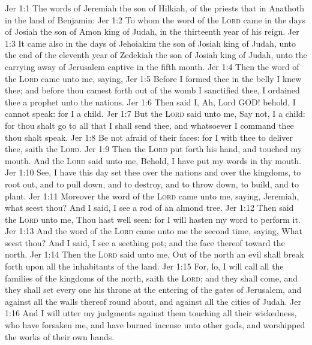 \vs Jer 1:1 The words of Jeremiah the son of Hilkiah, of the priests that  in Anathoth in the land of Benjamin:
\vs Jer 1:2 To whom the word of the \textsc{Lord} came in the days of Josiah the son of Amon king of Judah, in the thirteenth year of his reign.
\vs Jer 1:3 It came also in the days of Jehoiakim the son of Josiah king of Judah, unto the end of the eleventh year of Zedekiah the son of Josiah king of Judah, unto the carrying away of Jerusalem captive in the fifth month.
\vs Jer 1:4 Then the word of the \textsc{Lord} came unto me, saying,
\vs Jer 1:5 Before I formed thee in the belly I knew thee; and before thou camest forth out of the womb I sanctified thee,  I ordained thee a prophet unto the nations.
\vs Jer 1:6 Then said I, Ah, Lord GOD! behold, I cannot speak: for I  a child.
\vs Jer 1:7 But the \textsc{Lord} said unto me, Say not, I  a child: for thou shalt go to all that I shall send thee, and whatsoever I command thee thou shalt speak.
\vs Jer 1:8 Be not afraid of their faces: for I  with thee to deliver thee, saith the \textsc{Lord}.
\vs Jer 1:9 Then the \textsc{Lord} put forth his hand, and touched my mouth. And the \textsc{Lord} said unto me, Behold, I have put my words in thy mouth.
\vs Jer 1:10 See, I have this day set thee over the nations and over the kingdoms, to root out, and to pull down, and to destroy, and to throw down, to build, and to plant.
\vs Jer 1:11 Moreover the word of the \textsc{Lord} came unto me, saying, Jeremiah, what seest thou? And I said, I see a rod of an almond tree.
\vs Jer 1:12 Then said the \textsc{Lord} unto me, Thou hast well seen: for I will hasten my word to perform it.
\vs Jer 1:13 And the word of the \textsc{Lord} came unto me the second time, saying, What seest thou? And I said, I see a seething pot; and the face thereof  toward the north.
\vs Jer 1:14 Then the \textsc{Lord} said unto me, Out of the north an evil shall break forth upon all the inhabitants of the land.
\vs Jer 1:15 For, lo, I will call all the families of the kingdoms of the north, saith the \textsc{Lord}; and they shall come, and they shall set every one his throne at the entering of the gates of Jerusalem, and against all the walls thereof round about, and against all the cities of Judah.
\vs Jer 1:16 And I will utter my judgments against them touching all their wickedness, who have forsaken me, and have burned incense unto other gods, and worshipped the works of their own hands.

